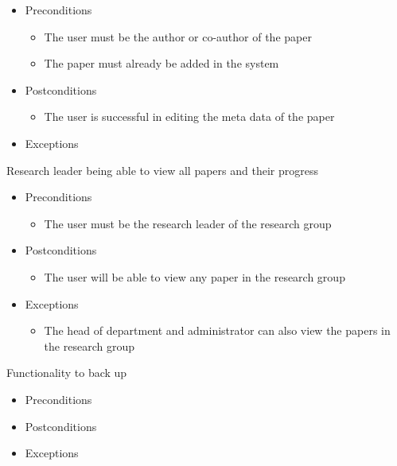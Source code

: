 \documentclass[a4paper,12pt]{article}
\begin{document}
\begin{itemize}
    \item Preconditions
    \begin{itemize}
        \item The user must be the author or co-author of the paper
        \item The paper must already be added in the system
    \end{itemize}
    \item Postconditions
    \begin{itemize}
        \item The user is successful in editing the meta data of the paper
    \end{itemize}
    \item Exceptions
    \begin{itemize}
    \end{itemize}
\end{itemize}
Research leader being able to view all papers and their progress
\begin{itemize}
    \item Preconditions
    \begin{itemize}
        \item The user must be the research leader of the research group
    \end{itemize}
    \item Postconditions
    \begin{itemize}
        \item The user will be able to view any paper in the research group
    \end{itemize}
    \item Exceptions
    \begin{itemize}
        \item The head of department and administrator can also view the papers in the research group
    \end{itemize}
\end{itemize}
Functionality to back up 
\begin{itemize}
    \item Preconditions
    \item Postconditions
    \item Exceptions
\end{itemize}
\end{document}
